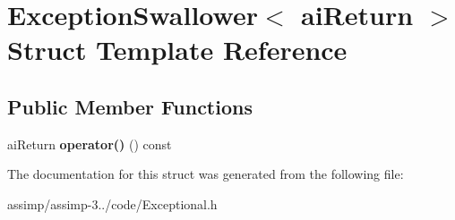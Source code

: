 \hypertarget{struct_exception_swallower_3_01ai_return_01_4}{\section{Exception\+Swallower$<$ ai\+Return $>$ Struct Template Reference}
\label{struct_exception_swallower_3_01ai_return_01_4}
}
\subsection*{Public Member Functions}
\begin{DoxyCompactItemize}
\item 
\hypertarget{struct_exception_swallower_3_01ai_return_01_4_a4bcb725e422d1aab9cfcb3d3b1b8ae51}{ai\+Return {\bfseries operator()} () const }\label{struct_exception_swallower_3_01ai_return_01_4_a4bcb725e422d1aab9cfcb3d3b1b8ae51}

\end{DoxyCompactItemize}


The documentation for this struct was generated from the following file\+:\begin{DoxyCompactItemize}
\item 
assimp/assimp-\/3../code/Exceptional.\+h\end{DoxyCompactItemize}

